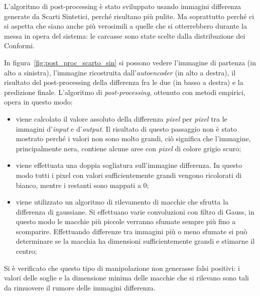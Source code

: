 L'algoritmo di post-processing è stato sviluppato usando immagini differenza generate da Scarti Sintetici, perché risultano più pulite.
Ma soprattutto perché ci si aspetta che siano anche più verosimili a quelle che si otterrebbero durante la messa in opera del sistema: le carcasse sono state scelte dalla distribuzione dei Conformi. 

In figura~\ref{fig:post_proc_scarto_sin} si possono vedere l'immagine di partenza (in alto a sinistra), l'immagine ricostruita dall'\textit{autoencoder} (in alto a destra), il risultato del post-processing della differenza fra le due (in basso a destra) e la predizione finale.
L'algoritmo di \textit{post-processing}, ottenuto con metodi empirici, opera in questo modo:
\begin{itemize}
  \item viene calcolato il valore assoluto della differenza \textit{pixel} per \textit{pixel} tra le immagini d'\textit{input} e d'\textit{output}.
    Il risultato di questo passaggio non è stato mostrato perché i valori non sono molto grandi, ciò significa che l'immagine, principalmente nera, contiene alcune aree con \textit{pixel} di colore grigio scuro;

  \item viene effettuata una doppia sogliatura sull'immagine differenza.
    In questo modo tutti i pixel con valori sufficientemente grandi vengono ricolorati di bianco, mentre i restanti sono mappati a $0$;


  \item viene utilizzato un algoritmo di rilevamento di macchie che sfrutta la differenza di gaussiane.
    Si effettuano varie convoluzioni con filtro di Gauss, in questo modo le macchie più piccole verranno sfumate sempre più fino a scomparire.
    Effettuando differenze tra immagini più o meno sfumate si può determinare se la macchia ha dimensioni sufficientemente grandi e stimarne il centro;

\end{itemize}

Si è verificato che questo tipo di manipolazione non generasse falsi positivi: i valori delle soglie e la dimensione minima delle macchie che si rilevano sono tali da rimuovere il rumore delle immagini differenza.

